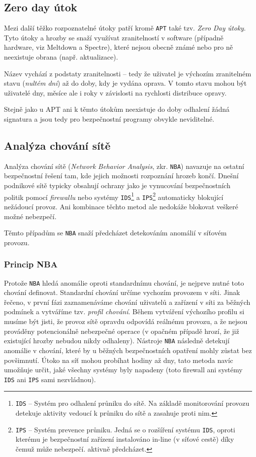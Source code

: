\subsection{Zero day útok}

Mezi další těžko rozpoznatelné útoky patří kromě \texttt{APT} také tzv. \textit{Zero Day útoky}.
Tyto útoky a hrozby se snaží využívat zranitelností v software (případně hardware, viz Meltdown a Spectre), které nejsou obecně známé nebo pro ně neexistuje obrana (např. aktualizace).

Název vychází z podstaty zranitelnosti -- tedy že uživatel je výchozím zranitelném stavu (\textit{nultém dni}) až do doby, kdy je vydána oprava.
V tomto stavu mohou být uživatelé dny, měsíce ale i roky v závislosti na rychlosti distribuce opravy.

Stejně jako u APT ani k těmto útokům neexistuje do doby odhalení žádná signatura a jsou tedy pro bezpečnostní programy obvykle neviditelné.

\subsection{Analýza chování sítě}

Analýza chování sítě (\textit{Network Behavior Analysis}, zkr. \texttt{NBA}) navazuje na ostatní bezpečnostní řešení tam, kde jejich možnosti rozpoznání hrozeb končí.
Dnešní podnikové sítě typicky obsahují ochrany jako je vynucování bezpečnostních politik pomocí \textit{firewallu} nebo systémy \texttt{IDS}\footnote{\texttt{IDS} -- Systém pro odhalení průniku do sítě. Na základě monitorování provozu detekuje aktivity vedoucí k průniku do sítě a zasahuje proti nim.} a \texttt{IPS}\footnote{\texttt{IPS} -- Systém prevence průniku. Jedná se o rozšíření systému \texttt{IDS}, oproti kterému je bezpečnostní zařízení instalováno in-line (v síťové cestě) díky čemuž může nebezpečí. aktivně předcházet.} automaticky blokující nežádoucí provoz.
Ani kombinace těchto metod ale nedokáže blokovat veškeré možné nebezpečí.

Těmto případům se \texttt{NBA} snaží předcházet detekováním anomálií v síťovém provozu.

\subsubsection*{Princip NBA}

Protože \texttt{NBA} hledá anomálie oproti standardnímu chování, je nejprve nutné toto chování definovat.
Standardní chování určíme vychozím provozem v síti.
Jinak řečeno, v první fázi zaznamenáváme chování uživatelů a zařízení v síti za běžných podmínek a vytváříme tzv. \textit{profil chování}.
Během vytváření výchozího profilu si musíme být jisti, že provoz sítě opravdu odpovídá reálnému provozu, a že nejsou prováděny potencionálně nebezpečné operace (v opačném případě hrozí, že již existující hrozby nebudou nikdy odhaleny).
Nástroje \texttt{NBA} následně detekují anomálie v chování, které by u běžných bezpečnostních opatření mohly zůstat bez povšimnutí.
Útoko na síť mohou probíhat hodiny až dny, tato metoda navíc umožňuje určit, jaké všechny systémy byly napadeny (toto firewall ani systémy \texttt{IDS} ani \texttt{IPS} sami nezvládnou).

